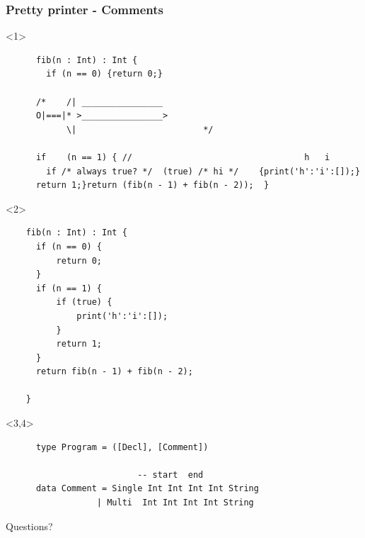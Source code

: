 \documentclass{beamer}
\begin{document}
\begin{frame}[fragile]
  \frametitle{Pretty printer - Comments}
  \begin{onlyenv}<1>
    \begin{verbatim}
      fib(n : Int) : Int {
        if (n == 0) {return 0;}
      
      /*    /| ________________
      O|===|* >________________>
            \|                         */

      if    (n == 1) { //                                  h   i 
        if /* always true? */  (true) /* hi */    {print('h':'i':[]);}
      return 1;}return (fib(n - 1) + fib(n - 2));  }
    \end{verbatim}
  \end{onlyenv}

  \begin{onlyenv}<2>
    \begin{verbatim}
    fib(n : Int) : Int {
      if (n == 0) {
          return 0;
      }
      if (n == 1) {
          if (true) {
              print('h':'i':[]);
          }
          return 1;
      }
      return fib(n - 1) + fib(n - 2);

    }
    \end{verbatim}
  \end{onlyenv}


  \begin{onlyenv}<3,4>
    \begin{verbatim}
      type Program = ([Decl], [Comment])

                          -- start  end 
      data Comment = Single Int Int Int Int String
                  | Multi  Int Int Int Int String
    \end{verbatim}
  \end{onlyenv}
\end{frame}

\begin{frame}
  \begin{center}Questions?\end{center}
\end{frame}
\end{document}
